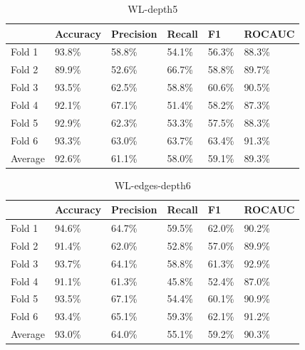 \documentclass{IEEEtran}
\begin{document}
\begin{table}
    \centering
    \begin{tabular}{l||llll|l}
        \textbf{} & \textbf{Accuracy} & \textbf{Precision} & \textbf{Recall} & \textbf{F1} & \textbf{ROCAUC} \\
        \hline \hline
        Fold 1    & 93.8\%            & 58.8\%             & 54.1\%          & 56.3\%      & 88.3\%          \\
        Fold 2    & 89.9\%            & 52.6\%             & 66.7\%          & 58.8\%      & 89.7\%          \\
        Fold 3    & 93.5\%            & 62.5\%             & 58.8\%          & 60.6\%      & 90.5\%          \\
        Fold 4    & 92.1\%            & 67.1\%             & 51.4\%          & 58.2\%      & 87.3\%          \\
        Fold 5    & 92.9\%            & 62.3\%             & 53.3\%          & 57.5\%      & 88.3\%          \\
        Fold 6    & 93.3\%            & 63.0\%             & 63.7\%          & 63.4\%      & 91.3\%          \\
        \hline
        Average   & 92.6\%            & 61.1\%             & 58.0\%          & 59.1\%      & 89.3\%          \\
    \end{tabular}
    \caption{WL-depth5}
\end{table}


\begin{table}
    \centering
    \begin{tabular}{l||llll|l}
        \textbf{} & \textbf{Accuracy} & \textbf{Precision} & \textbf{Recall} & \textbf{F1} & \textbf{ROCAUC} \\
        \hline \hline
        Fold 1    & 94.6\%            & 64.7\%             & 59.5\%          & 62.0\%      & 90.2\%          \\
        Fold 2    & 91.4\%            & 62.0\%             & 52.8\%          & 57.0\%      & 89.9\%          \\
        Fold 3    & 93.7\%            & 64.1\%             & 58.8\%          & 61.3\%      & 92.9\%          \\
        Fold 4    & 91.1\%            & 61.3\%             & 45.8\%          & 52.4\%      & 87.0\%          \\
        Fold 5    & 93.5\%            & 67.1\%             & 54.4\%          & 60.1\%      & 90.9\%          \\
        Fold 6    & 93.4\%            & 65.1\%             & 59.3\%          & 62.1\%      & 91.2\%          \\
        \hline
        Average   & 93.0\%            & 64.0\%             & 55.1\%          & 59.2\%      & 90.3\%          \\
    \end{tabular}
    \caption{WL-edges-depth6}
\end{table}
\end{document}
